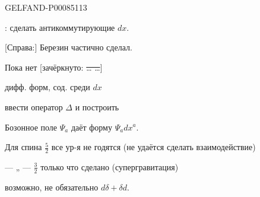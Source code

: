 \begin{GelfandAdjacentEvidence}{GELFAND-P000851}{13}


: сделать антикоммутирующие \(dx\).

[Справа:] Березин частично сделал.

Пока нет [зачёркнуто: \sout{… …}]
\end{GelfandAdjacentEvidence}

дифф. форм, сод. среди \(dx\) 

ввести оператор \(\Delta\) и построить 

Бозонное поле \(\Psi_a\) даёт форму \(\Psi_a dx^a\).

Для спина \(\frac52\) все ур-я не годятся (не удаётся сделать взаимодействие)

— „ — \(\frac32\) только что сделано (супергравитация)

 возможно, не обязательно \(d\delta+\delta d\).


